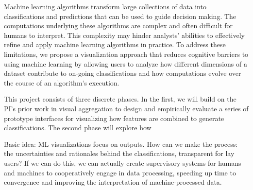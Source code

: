 Machine learning algorithms transform large collections of data into classifications and predictions that can be used to guide decision making. The computations underlying these algorithms are complex and often difficult for humans to interpret. This complexity may hinder analysts' abilities to effectively refine and apply machine learning algorithms in practice. To address these limitations, we propose a visualization approach that reduces cognitive barriers to using machine learning by allowing users to analyze how different dimensions of a dataset contribute to on-going classifications and how computations evolve over the course of an algorithm's execution.

This project consists of three discrete phases. In the first, we will build on the PI's prior work in visual aggregation to design and empirically evaluate a series of prototype interfaces for visualizing how features are combined to generate classifications. The second phase will explore how   

Basic idea: ML visualizations focus on outputs. How can we make the process: the uncertainties and rationales behind the classifications, transparent for lay users? If we can do this, we can actually create supervisory systems for humans and machines to cooperatively engage in data processing, speeding up time to convergence and improving the interpretation of machine-processed data. 

